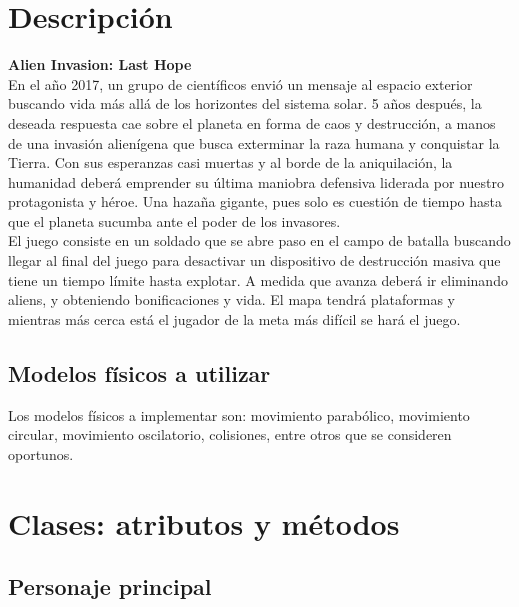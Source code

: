 \documentclass{article}
\begin{document}
\section{Descripción}
\textbf{Alien Invasion: Last Hope}\\

En el año 2017, un grupo de científicos envió un mensaje al espacio exterior buscando vida más allá de los horizontes del sistema solar. 5 años después, la deseada respuesta cae sobre el planeta en forma de caos y destrucción, a manos de una invasión alienígena que busca exterminar la raza humana y conquistar la Tierra. Con sus esperanzas casi muertas y al borde de la aniquilación, la humanidad deberá emprender su última maniobra defensiva liderada por nuestro protagonista y héroe. Una hazaña gigante, pues solo es cuestión de tiempo hasta que el planeta sucumba ante el poder de los invasores.\\

El juego consiste en un soldado que se abre paso en el campo de batalla buscando llegar al final del juego para desactivar un dispositivo de destrucción masiva que tiene un tiempo límite hasta explotar. A medida que avanza deberá ir eliminando aliens, y obteniendo bonificaciones y vida. El mapa tendrá plataformas y mientras más cerca está el jugador de la meta más difícil se hará el juego.

\subsection{Modelos físicos a utilizar}
Los modelos físicos a implementar son: movimiento parabólico, movimiento circular, movimiento oscilatorio, colisiones, entre otros que se consideren oportunos.


\section{Clases: atributos y métodos}

\subsection{Personaje principal}
\end{document}
